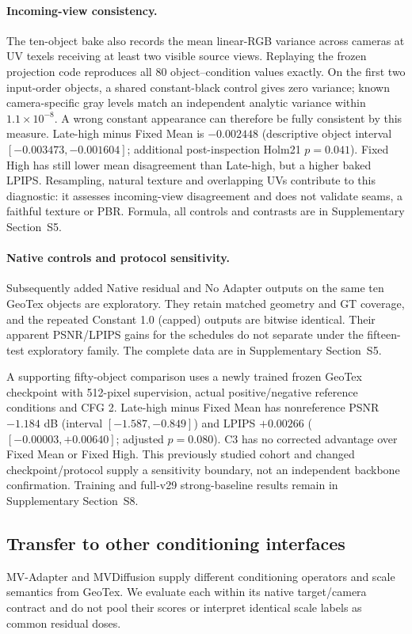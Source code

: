 \documentclass[times,twocolumn,final]{elsarticle}
\begin{document}
\paragraph{Incoming-view consistency.}
The ten-object bake also records the mean linear-RGB variance across cameras at UV texels receiving at least two visible source views. Replaying the frozen projection code reproduces all 80 object--condition values exactly. On the first two input-order objects, a shared constant-black control gives zero variance; known camera-specific gray levels match an independent analytic variance within $1.1\times10^{-8}$. A wrong constant appearance can therefore be fully consistent by this measure. Late-high minus Fixed Mean is $-0.002448$ (descriptive object interval $[-0.003473,-0.001604]$; additional post-inspection Holm21 $p=0.041$). Fixed High has still lower mean disagreement than Late-high, but a higher baked LPIPS. Resampling, natural texture and overlapping UVs contribute to this diagnostic: it assesses incoming-view disagreement and does not validate seams, a faithful texture or PBR. Formula, all controls and contrasts are in Supplementary Section~S5.

\paragraph{Native controls and protocol sensitivity.}
Subsequently added Native residual and No Adapter outputs on the same ten GeoTex objects are exploratory. They retain matched geometry and GT coverage, and the repeated Constant 1.0 (capped) outputs are bitwise identical. Their apparent PSNR/LPIPS gains for the schedules do not separate under the fifteen-test exploratory family. The complete data are in Supplementary Section~S5.

A supporting fifty-object comparison uses a newly trained frozen GeoTex checkpoint with 512-pixel supervision, actual positive/negative reference conditions and CFG 2. Late-high minus Fixed Mean has nonreference PSNR $-1.184$ dB (interval $[-1.587,-0.849]$) and LPIPS $+0.00266$ ($[-0.00003,+0.00640]$; adjusted $p=0.080$). C3 has no corrected advantage over Fixed Mean or Fixed High. This previously studied cohort and changed checkpoint/protocol supply a sensitivity boundary, not an independent backbone confirmation. Training and full-v29 strong-baseline results remain in Supplementary Section~S8.

\subsection{Transfer to other conditioning interfaces}
\label{subsec:cross-interface}
MV-Adapter and MVDiffusion supply different conditioning operators and scale semantics from GeoTex. We evaluate each within its native target/camera contract and do not pool their scores or interpret identical scale labels as common residual doses.
\end{document}
